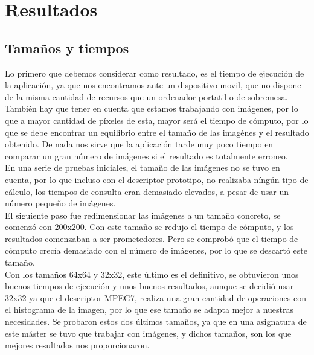 \chapter{Resultados}
\label{cap:resultados}

\section{Tamaños y tiempos}
Lo primero que debemos considerar como resultado, es el tiempo de ejecución de la aplicación, ya que nos encontramos ante un dispositivo movil, que no dispone de la misma cantidad de recursos que un ordenador portatil o de sobremesa.\\

También hay que tener en cuenta que estamos trabajando con imágenes, por lo que a mayor cantidad de píxeles de esta, mayor será el tiempo de cómputo, por lo que se debe encontrar un equilibrio entre el tamaño de las imagénes y el resultado obtenido. De nada nos sirve que la aplicación tarde muy poco tiempo en comparar un gran número de imágenes si el resultado es totalmente erroneo.\\

En una serie de pruebas iniciales, el tamaño de las imágenes no se tuvo en cuenta, por lo que incluso con el descriptor prototipo, no realizaba níngún tipo de cálculo, los tiempos de consulta eran demasiado elevados, a pesar de usar un número pequeño de imágenes.\\

El siguiente paso fue redimensionar las imágenes a un tamaño concreto, se comenzó con 200x200. Con este tamaño se redujo el tiempo de cómputo, y los resultados comenzaban a ser prometedores. Pero se comprobó que el tiempo de cómputo crecía demasiado con el número de imágenes, por lo que se descartó este tamaño.\\

Con los tamaños 64x64 y 32x32, este último es el definitivo, se obtuvieron unos buenos tiempos de ejecución y unos buenos resultados, aunque se decidió usar 32x32 ya que el descriptor MPEG7, realiza una gran cantidad de operaciones con el histograma de la imagen, por lo que ese tamaño se adapta mejor a nuestras necesidades. Se probaron estos dos últimos tamaños, ya que en una asignatura de este máster se tuvo que trabajar con imágenes, y dichos tamaños, son los que mejores resultados nos proporcionaron.\\

